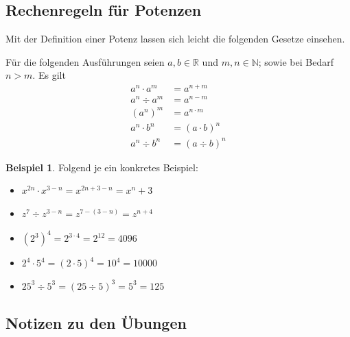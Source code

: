 \documentclass[%
11pt,%
twoside,%
titlepage,%
swissgerman,%
headsepline%
]{scrartcl}
\theoremstyle{definition}
\newtheorem{bsp}{Beispiel}[subsection] %
\theoremstyle{plain}
\begin{document}
\subsection{Rechenregeln für Potenzen}

Mit der Definition einer Potenz lassen sich leicht die folgenden Gesetze einsehen.

Für die folgenden Ausführungen seien $a,b\in\mathbb{R}$ und $m,n\in\mathbb{N}$; sowie bei Bedarf $n>m$. Es gilt
\begin{align}
a^n\cdot a^m&=a^{n+m}\\
a^n\div a^m&=a^{n-m}\\
\left(a^n\right)^m&=a^{n\cdot m}\\
a^n\cdot b^n&=(a\cdot b)^{n}\\
a^n\div b^n&=(a\div b)^{n}
\end{align}

\begin{bsp}
Folgend je ein konkretes Beispiel:
\begin{itemize}
\item $x^{2n}\cdot x^{3-n}=x^{2n+3-n}=x^n+3$
\item $z^7\div z^{3-n}=z^{7-(3-n)}=z^{n+4}$
\item $\left(2^3\right)^4=2^{3\cdot4}=2^{12}=4096$
\item $2^4\cdot5^4=(2\cdot5)^4=10^4=10000$
\item $25^3\div5^3=(25\div5)^3=5^3=125$
\end{itemize}
\end{bsp}

\clearpage

\subsection{Notizen zu den Übungen}
\end{document}
